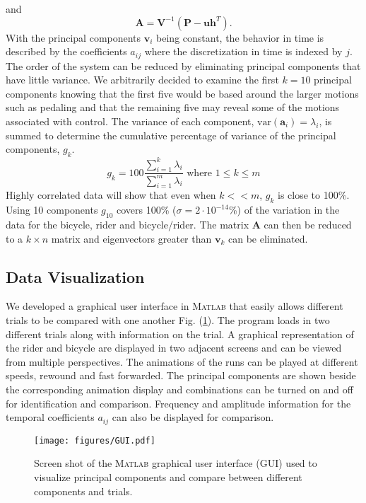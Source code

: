 and
\begin{equation}
    \mathbf{A}=\mathbf{V}^{-1}(\mathbf{P}-\mathbf{u}\mathbf{h}^T)\textrm{.}
\end{equation}
With the principal components $\mathbf{v}_i$ being constant, the behavior in
time is described by the coefficients $a_{ij}$ where the discretization in time
is indexed by $j$. The order of the system can be reduced by eliminating
principal components that have little variance. We arbitrarily decided to
examine the first $k=10$ principal components knowing that the first five would
be based around the larger motions such as pedaling and that the remaining five
may reveal some of the motions associated with control. The variance of each
component, $\textrm{var}(\mathbf{a}_i)=\lambda_i$, is summed to determine the
cumulative percentage of variance of the principal components, $g_k$.
\begin{equation}
    g_k=100\frac{\sum_{i=1}^k\lambda_i}{\sum_{i=1}^m\lambda_i}\textrm{ where }1\leq k\leq m
\end{equation}
Highly correlated data will show that even when $k<<m$, $g_k$ is close to
100\%. Using 10 components $g_{10}$ covers 100\% ($\sigma=2\cdot10^{-14}$\%) of
the variation in the data for the bicycle, rider and bicycle/rider. The matrix
$\mathbf{A}$ can then be reduced to a $k\times n$ matrix and eigenvectors
greater than $\mathbf{v}_k$ can be eliminated.

\subsection{Data Visualization}
\label{sec:dataVis}
We developed a graphical user interface in \textsc{Matlab} that easily allows
different trials to be compared with one another Fig. (\ref{fig:GUI}). The
program loads in two different trials along with information on the trial. A
graphical representation of the rider and bicycle are displayed in two adjacent
screens and can be viewed from multiple perspectives. The animations of the
runs can be played at different speeds, rewound and fast forwarded. The
principal components are shown beside the corresponding animation display and
combinations can be turned on and off for identification and comparison.
Frequency and amplitude information for the temporal coefficients $a_{ij}$ can
also be displayed for comparison.
\begin{figure}[]
    \begin{center}
        \texttt{[image: figures/GUI.pdf]}
    \end{center}
    \caption{Screen shot of the \textsc{Matlab} graphical user interface (GUI) used to visualize principal components and compare between different components and trials.}
    \label{fig:GUI}
\end{figure}

